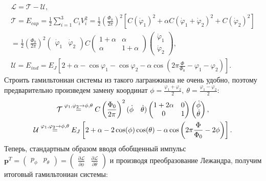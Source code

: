 \documentclass[12pt, twoside]{report}
\numberwithin{equation}{section}
\numberwithin{figure}{section}
\begin{document}
\begin{gather*}
\mathcal{L} = \mathcal{T}-\mathcal{U}, \\
\mathcal{T} = E_{cap} =\frac{1}{2}\sum_{i=1}^3 C_i V_i^2 = \frac{1}{2} \left(\frac{\Phi_0}{2\pi}\right)^2 \left[C(\dot \varphi_1)^2 + \alpha C \left(\dot \varphi_1 + \dot\varphi_2\right)^2 + C(\dot \varphi_2)^2\right] \\
= \frac{1}{2}\left(\frac{\Phi_0}{2\pi}\right)^2 \left(\begin{matrix}
\dot\varphi_1 &\dot\varphi_2
\end{matrix}\right) C \left(\begin{matrix}
1+\alpha & \alpha \\
\alpha & 1+\alpha
\end{matrix}
\right)
\left(\begin{matrix}
\dot\varphi_1 \\
\dot\varphi_2
\end{matrix}\right),\\
\mathcal{U} = E_{ind} = E_J\left[2+\alpha - \cos\varphi_1 - \cos\varphi_2 - \alpha \cos\left(2\pi\frac{\Phi}{\Phi_0} - \varphi_1 - \varphi_2 \right)\right].
\end{gather*}
Строить гамильтониан системы из такого лагранжиана не очень удобно, поэтому предварительно произведем замену координат $\displaystyle \phi = \frac{\varphi_1 + \varphi_2}{2},\ \theta = \frac{\varphi_1 - \varphi_2}{2}$:
\begin{gather}
\mathcal{T}  \overset {\varphi_1, \varphi_2 \rightarrow \phi, \theta}{=}
C\left(\frac{\Phi_0}{2\pi}\right)^2 (\begin{matrix}
\dot \phi & \dot \theta
\end{matrix})
\left(\begin{matrix}
1+2\alpha & 0\\
0 & 1
\end{matrix}
\right)
\left(\begin{matrix}
\dot \phi \\ \dot \theta
\end{matrix}\right), \notag
\\
\mathcal{U} \overset {\varphi_1, \varphi_2 \rightarrow \phi, \theta}{=} E_J\left[2+\alpha - 2\cos(\phi)\cos(\theta) - \alpha\cos\left(2\pi\frac{\Phi}{\Phi_0} -2\phi\right)\right].
\label{eq:U_qb}
\end{gather}
Теперь, стандартным образом вводя обобщенный импульс 
$\displaystyle \mathbf{p}^T = \left(\begin{matrix}p_\phi & p_\theta\end{matrix}\right) = \left(\begin{matrix}\frac{\partial\mathcal{L}}{\partial\dot\phi} & \frac{\partial\mathcal{L}}{\partial\dot\theta}\end{matrix}\right)$ и производя преобразование Лежандра, получим итоговый гамильтониан системы:
\end{document}
